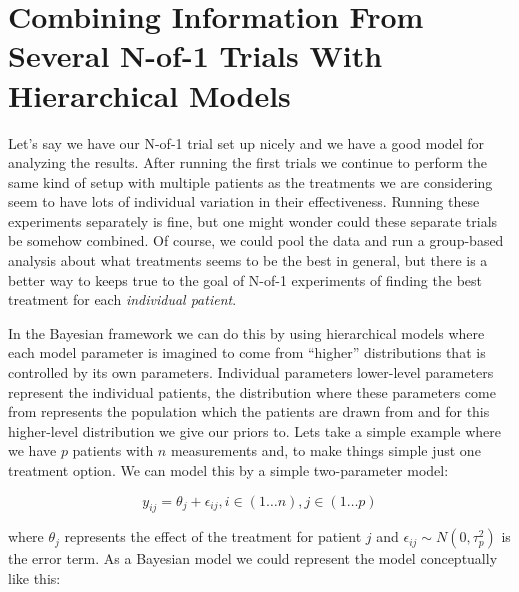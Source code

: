 \documentclass[12pt,a4paper,leqno]{report}
\theoremstyle{plain}
\theoremstyle{definition}
\theoremstyle{remark}
\begin{document}
\chapter{Combining Information From Several N-of-1 Trials With Hierarchical
  Models}\label{hierarchicalbayes}

Let's say we have our N-of-1 trial set up nicely and we have a good model for analyzing the
results. After running the first trials we continue to perform the same kind of setup
with multiple patients as the treatments we are considering seem to have lots of
individual variation in their effectiveness. Running these experiments separately is
fine, but one might wonder could these separate trials be somehow combined. Of course, we could pool the data and run a group-based
analysis about what treatments seems to be the best in general, but there is a better
way to keeps true to the goal of N-of-1 experiments of finding the best treatment for
each \emph{individual patient}.

In the Bayesian framework we can do this by using hierarchical
models where each model parameter is imagined to come from ``higher'' distributions
that is controlled by its own parameters. Individual parameters lower-level parameters represent the
individual patients, the distribution where these parameters come from represents
the population which the patients are drawn from and for this higher-level distribution
we give our priors to. Lets take a simple example where we have $p$ patients with $n$
measurements and, to make things simple just one treatment option. We can model this by
a simple two-parameter model:

\begin{def}\label{}
    \begin{equation}\label{simplehierachical}
        y_{ij} = \theta_j + \epsilon_{ij}, i\in(1 \dots n), j\in(1 \dots p)
    \end{equation}
\end{def}where $\theta_j$ represents the effect of the treatment for patient $j$ and
\(\epsilon_{ij} \sim N(0,\tau_p^2)\) is the error term. As a Bayesian model we could
represent the model conceptually like this:

\bigskip
\end{document}
